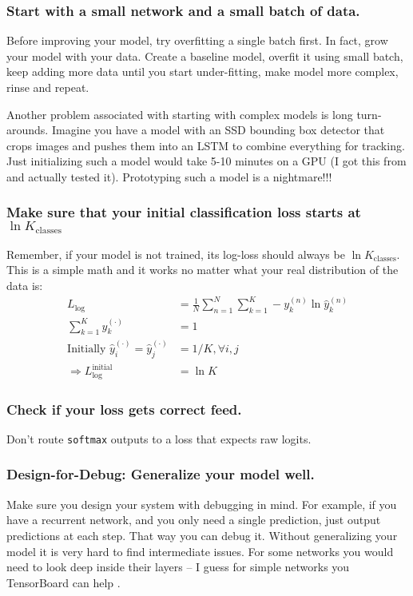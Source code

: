 \subsubsection*{Start with a small network and a small batch of data.}
Before improving your model, try overfitting a single batch first.
In fact, grow your model with your data.
Create a baseline model, overfit it using small batch, keep adding more data until you start under-fitting, make model more complex, rinse and repeat.

Another problem associated with starting with complex models is long turn-arounds.
Imagine you have a model with an SSD bounding box detector that crops images and pushes them into an LSTM to combine everything for tracking.
Just initializing such a model would take 5-10 minutes on a GPU (I got this from \cite{twitter:karpathy:nn:300618} and actually tested it).
Prototyping such a model is a nightmare!!!

\subsubsection*{Make sure that your initial classification loss starts at $\ln K_\text{classes}$}
Remember, if your model is not trained, its log-loss should always be $\ln K_\text{classes}$.
This is a simple math and it works no matter what your real distribution of the data is:
\begin{align*}
L_\text{log} &= \frac{1}{N}\sum_{n=1}^{N}\sum_{k=1}^{K}-y_k^{(n)}\ln\hat{y}_k^{(n)} \\
\sum_{k=1}^{K}y_k^{(\cdot)} &= 1 \\
\text{Initially } \hat{y}_i^{(\cdot)} = \hat{y}_j^{(\cdot)} &= 1/K, \forall{i,j}\\
\Rightarrow L_\text{log}^\text{initial} &= \ln{K}
\end{align*}

\subsubsection*{Check if your loss gets correct feed.}
Don't route \verb+softmax+ outputs to a loss that expects raw logits.

\subsubsection*{Design-for-Debug: Generalize your model well.}
Make sure you design your system with debugging in mind.
For example, if you have a recurrent network, and you only need a single prediction, just output predictions at each step.
That way you can debug it.
Without generalizing your model it is very hard to find intermediate issues.
For some networks you would need to look deep inside their layers -- I guess for simple networks you TensorBoard can help \cite{tensorflow2015-whitepaper}.

